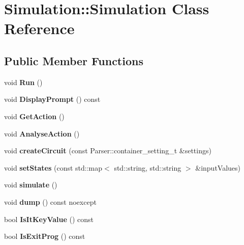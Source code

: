 \hypertarget{classSimulation_1_1Simulation}{}\section{Simulation\+:\+:Simulation Class Reference}
\label{classSimulation_1_1Simulation}
\subsection*{Public Member Functions}
\begin{DoxyCompactItemize}
\item 
\mbox{\label{classSimulation_1_1Simulation_a76f716557481fa87591764fe127ba0c4}} 
void {\bfseries Run} ()
\item 
\mbox{\label{classSimulation_1_1Simulation_aadcb620861a93109fbf78e7594f565ef}} 
void {\bfseries Display\+Prompt} () const
\item 
\mbox{\label{classSimulation_1_1Simulation_a8219e53e9cb91d46c978333510acc41b}} 
void {\bfseries Get\+Action} ()
\item 
\mbox{\label{classSimulation_1_1Simulation_ac967c92d37ff3e7cdf9ff175b0eaef38}} 
void {\bfseries Analyse\+Action} ()
\item 
\mbox{\label{classSimulation_1_1Simulation_a8f58b7b50246da7c6cf4b256346b47de}} 
void {\bfseries create\+Circuit} (const Parser\+::container\+\_\+setting\+\_\+t \&settings)
\item 
\mbox{\label{classSimulation_1_1Simulation_aba2a9d7d14c5a38749c85ba344f9a208}} 
void {\bfseries set\+States} (const std\+::map$<$ std\+::string, std\+::string $>$ \&input\+Values)
\item 
\mbox{\label{classSimulation_1_1Simulation_a8db10dc7a246e985fd1a1deb8b05f29f}} 
void {\bfseries simulate} ()
\item 
\mbox{\label{classSimulation_1_1Simulation_aed2302b1ff4d372c2c8b60f7d633a185}} 
void {\bfseries dump} () const noexcept
\item 
\mbox{\label{classSimulation_1_1Simulation_a2efb3584b9bae48773cf65b88e131c87}} 
bool {\bfseries Is\+It\+Key\+Value} () const
\item 
\mbox{\label{classSimulation_1_1Simulation_a30c2722aa53e9c98f3d66880602d418d}} 
bool {\bfseries Is\+Exit\+Prog} () const
\end{DoxyCompactItemize}
